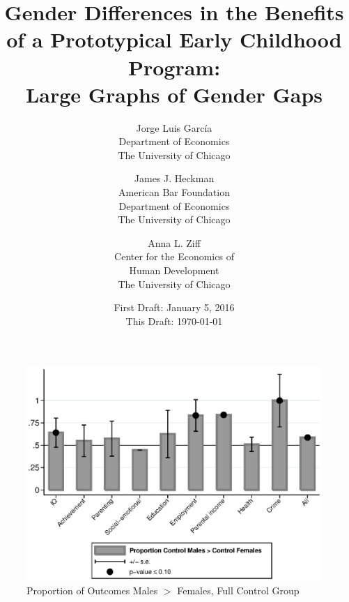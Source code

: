 


\usepackage[stable]{footmisc}

\newcommand*\leftright[2]{%
  \leavevmode
  \rlap{#1}%
  \hspace{0.5\linewidth}%
  #2}

\newcommand{\orth}{\ensuremath{\perp\!\!\!\perp}}%
\newcommand{\indep}{\orth}%
\newcommand{\notorth}{\ensuremath{\perp\!\!\!\!\!\!\diagup\!\!\!\!\!\!\perp}}%
\newcommand{\notindep}{\notorth}




\begin{titlepage}

\title{\Large \textbf{Gender Differences in the Benefits of a Prototypical Early Childhood Program: \\ Large Graphs of Gender Gaps}}

\author{
Jorge Luis Garc\'{i}a\\
Department of Economics\\
The University of Chicago \and
James J. Heckman \\
American Bar Foundation \\
Department of Economics\\
The University of Chicago \and
Anna L. Ziff \\
Center for the Economics of \\
Human Development \\
The University of Chicago}
\date{First Draft: January 5, 2016\\ This Draft: \today}

\maketitle
\restoregeometry
\end{titlepage}

\begin{figure}
\centering
\caption{Proportion of Outcomes Males $>$ Females, Full Control Group}
\includegraphics[width=\textwidth]{output/gendergaps-fullcontrol}
\end{figure}

